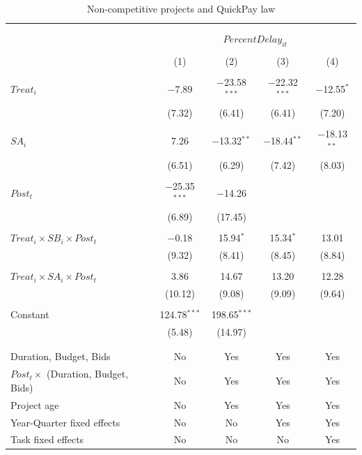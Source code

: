 \documentclass[
]{article}
\begin{document}
\begin{table}[H] \centering 
  \caption{Non-competitive projects and QuickPay law} 
  \label{} 
\small 
\begin{tabular}{@{\extracolsep{-2pt}}lcccc} 
\\[-1.8ex]\hline 
\hline \\[-1.8ex] 
\\[-1.8ex] & \multicolumn{4}{c}{$PercentDelay_{it}$  } \\ 
\\[-1.8ex] & (1) & (2) & (3) & (4)\\ 
\hline \\[-1.8ex] 
 $Treat_i$ & $-$7.89 & $-$23.58$^{***}$ & $-$22.32$^{***}$ & $-$12.55$^{*}$ \\ 
  & (7.32) & (6.41) & (6.41) & (7.20) \\ 
  & & & & \\ 
 $SA_i$ & 7.26 & $-$13.32$^{**}$ & $-$18.44$^{**}$ & $-$18.13$^{**}$ \\ 
  & (6.51) & (6.29) & (7.42) & (8.03) \\ 
  & & & & \\ 
 $Post_t$ & $-$25.35$^{***}$ & $-$14.26 &  &  \\ 
  & (6.89) & (17.45) &  &  \\ 
  & & & & \\ 
 $Treat_i \times SB_i \times Post_t$ & $-$0.18 & 15.94$^{*}$ & 15.34$^{*}$ & 13.01 \\ 
  & (9.32) & (8.41) & (8.45) & (8.84) \\ 
  & & & & \\ 
 $Treat_i \times SA_i \times Post_t$ & 3.86 & 14.67 & 13.20 & 12.28 \\ 
  & (10.12) & (9.08) & (9.09) & (9.64) \\ 
  & & & & \\ 
 Constant & 124.78$^{***}$ & 198.65$^{***}$ &  &  \\ 
  & (5.48) & (14.97) &  &  \\ 
  & & & & \\ 
\hline \\[-1.8ex] 
Duration, Budget, Bids & No & Yes & Yes & Yes \\ 
$Post_t \times $  (Duration, Budget, Bids) & No & Yes & Yes & Yes \\ 
Project age & No & Yes & Yes & Yes \\ 
Year-Quarter fixed effects & No & No & Yes & Yes \\ 
Task fixed effects & No & No & No & Yes \\ 

\end{tabular}
\end{table}
\end{document}
